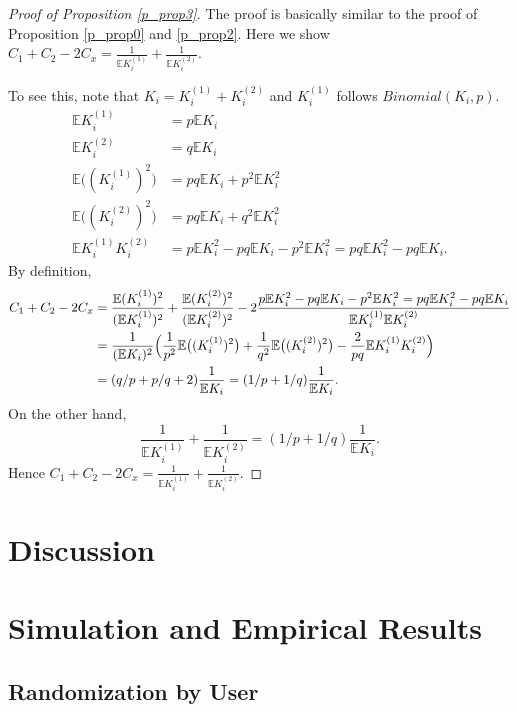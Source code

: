 \documentclass[10pt]{article}
\newcommand{\bbe}{\mathbb{E}}
\begin{document}
\begin{proof}[Proof of Proposition \ref{p_prop3}]
The proof is basically similar to the proof of Proposition \ref{p_prop0} and \ref{p_prop2}. Here we show  $C_1+C_2-2C_x = \frac{1 }{\bbe K_i^{(1)}}+\frac{1}{\bbe K_i^{(2)}}$. 

To see this, note that $K_i = K_i^{(1)}+K_i^{(2)}$ and $K_i^{(1)}$ follows $Binomial(K_i, p)$. 
\begin{align*}
\bbe K_i^{(1)} &= p\bbe K_i\\
\bbe K_i^{(2)} &=q\bbe K_i\\
\bbe \bigl((K_i^{(1)})^2\bigr)& = pq \bbe K_i + p^2 \bbe K_i^2\\
\bbe \bigl((K_i^{(2)})^2\bigr)& = pq \bbe K_i + q^2 \bbe K_i^2\\
\bbe K_i^{(1)}K_i^{(2)}& = p \bbe K_i^2 - pq \bbe K_i - p^2 \bbe K_i^2 = pq \bbe K_i^2 -pq \bbe K_i.
\end{align*}
By definition, 
\begin{align*}
C_1+C_2-2C_x &= \frac{\bbe (K_i^{(1)})^2}{(\bbe K_i^{(1)})^2} + \frac{\bbe (K_i^{(2)})^2}{(\bbe K_i^{(2)})^2} - 2 \frac{ p \bbe K_i^2 - pq \bbe K_i - p^2 \bbe K_i^2 = pq \bbe K_i^2 -pq \bbe K_i}{\bbe K_i^{(1)}\bbe K_i^{(2)}}\\
&= \frac{1}{(\bbe K_i)^2}\Bigl(\frac{1}{p^2 }\bbe \bigl((K_i^{(1)})^2\bigr)+\frac{1}{q^2}\bbe \bigl((K_i^{(2)})^2\bigr) - \frac{2}{pq}\bbe K_i^{(1)}K_i^{(2)} \Bigr)\\
& = (q/p + p/q +2) \frac{1}{\bbe K_i} = (1/p+1/q)\frac{1}{\bbe K_i}.
\end{align*}
On the other hand,
\[
\frac{1 }{\bbe K_i^{(1)}}+\frac{1}{\bbe K_i^{(2)}} = (1/p+1/q)\frac{1}{\bbe K_i}. 
\]
Hence $C_1+C_2-2C_x = \frac{1 }{\bbe K_i^{(1)}}+\frac{1}{\bbe K_i^{(2)}}$.
\end{proof}


\section{Discussion}\label{compare}

\section{Simulation and Empirical Results}\label{empirical}
\subsection{Randomization by User}
\end{document}
